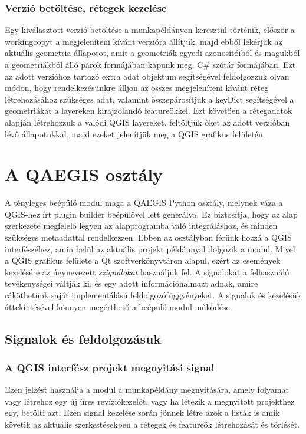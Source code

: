 \subsubsection{Verzió betöltése, rétegek kezelése}
Egy kiválasztott verzió betöltése a munkapéldányon keresztül történik, először a workingcopyt a megjeleníteni kívánt verzióra állítjuk, majd ebből lekérjük az aktuális geometria állapotot, amit a geometriák egyedi azonosítóiból és magukból a geometriákból álló párok formájában kapunk meg, C\# szótár formájában. Ezt az adott verzióhoz tartozó extra adat objektum segítségével feldolgozzuk olyan módon, hogy rendelkezésünkre álljon az összes megjeleníteni kívánt réteg létrehozásához szükséges adat, valamint összepárosítjuk a keyDict segítségével a geometriákat a layereken kirajzolandó featureökkel. Ezt követően a rétegadatok alapján létrehozzuk a valódi QGIS layereket, feltöltjük őket az adott verzióban lévő állapotukkal, majd ezeket jelenítjük meg a QGIS grafikus felületén.

\section{A QAEGIS osztály}
A tényleges beépülő modul maga a QAEGIS Python osztály, melynek váza a QGIS-hez írt plugin builder beépülővel lett generálva. Ez biztosítja, hogy az alap szerkezete megfelelő legyen az alapprogramba való integráláshoz, és minden szükséges metaadattal rendelkezzen. Ebben az osztályban férünk hozzá a QGIS interfészéhez, amin belül az aktuális projekt példánnyal dolgozik a modul. Mivel a QGIS grafikus felülete a Qt szoftverkönyvtáron alapul, ezért az események kezelésére az úgynevezett \emph{szignálokat}  használjuk fel. A signalokat a felhasználó tevékenységei váltják ki, és egy adott információhalmazt adnak, amire ráköthetünk saját implementálású feldolgozófüggvényeket. A signalok és kezelésük áttekintésével könnyen megérthető a beépülő modul működése.
\subsection{Signalok és feldolgozásuk}
\subsubsection{A QGIS interfész projekt megnyitási signal}
Ezen jelzést használja a modul a munkapéldány megnyitására, amely folyamat vagy létrehoz egy új üres revíziókezelőt, vagy ha létezik a megnyitott projekthez egy, betölti azt. Ezen signal kezelése során jönnek létre azok a listák is amik követik az aktuális szerkestésekben a rétegek és featureök létrehozását és törlését.
